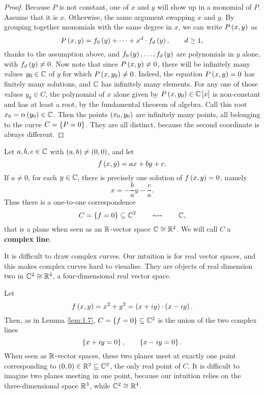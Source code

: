 \begin{proof}
Because $ P $ is not constant, one of $ x $ and $ y $ will show up in a monomial of $ P $. Assume that it is $ x $. Otherwise, the same argument swapping $ x $ and $ y $. By grouping together monomials with the same degree in $ x $, we can write $ P\br{x, y} $ as
$$ P\br{x, y} = f_0\br{y} + \dots + x^d \cdot f_d\br{y}, \qquad d \ge 1, $$
thanks to the assumption above, and $ f_0\br{y}, \dots, f_d\br{y} $ are polynomials in $ y $ alone, with $ f_d\br{y} \ne 0 $. Now note that since $ P\br{x, y} \ne 0 $, there will be infinitely many values $ y_0 \in \mathbb{C} $ of $ y $ for which $ P\br{x, y_0} \ne 0 $. Indeed, the equation $ P\br{x, y} = 0 $ has finitely many solutions, and $ \mathbb{C} $ has infinitely many elements. For any one of those values $ y_0 \in C $, the polynomial of $ x $ alone given by $ P\br{x, y_0} \in \C\sbr{x} $ is non-constant and has at least a root, by the fundamental theorem of algebra. Call this root $ x_0 = \alpha\br{y_0} \in \C $. Then the points $ \br{x_0, y_0} $ are infinitely many points, all belonging to the curve $ C = \cbr{P = 0} $. They are all distinct, because the second coordinate is always different.
\end{proof}

\begin{example}
Let $ a, b, c \in \mathbb{C} $ with $ \br{a, b} \ne \br{0, 0} $, and let
$$ f\br{x, y} = ax + by + c. $$
If $ a \ne 0 $, for each $ y \in \mathbb{C} $, there is precisely one solution of $ f\br{x, y} = 0 $, namely
$$ x = -\dfrac{b}{a}y - \dfrac{c}{a}. $$
Thus there is a one-to-one correspondence
$$ C = \cbr{f = 0} \subseteq \C^2 \qquad \leftrightsquigarrow \qquad \C, $$
that is a plane when seen as an $ \mathbb{R} $-vector space $ \mathbb{C} \cong \mathbb{R}^2 $. We will call $ C $ a \textbf{complex line}.
\end{example}

\begin{remark}
It is difficult to draw complex curves. Our intuition is for real vector spaces, and this makes complex curves hard to visualise. They are objects of real dimension two in $ \mathbb{C}^2 \cong \mathbb{R}^4 $, a four-dimensional real vector space.
\end{remark}

\begin{example}
Let
$$ f\br{x, y} = x^2 + y^2 = \br{x + iy} \cdot \br{x - iy}. $$
Then, as in Lemma \ref{lem:1.7}, $ C = \cbr{f = 0} \subseteq \C^2 $ is the union of the two complex lines
$$ \cbr{x + iy = 0}, \qquad \cbr{x - iy = 0}. $$
When seen as $ \mathbb{R} $-vector spaces, these two planes meet at exactly one point corresponding to $ \br{0, 0} \in \R^2 \subseteq \C^2 $, the only real point of $ C $. It is difficult to imagine two planes meeting in one point, because our intuition relies on the three-dimensional space $ \mathbb{R}^3 $, while $ \mathbb{C}^2 \cong \mathbb{R}^4 $.
\end{example}

